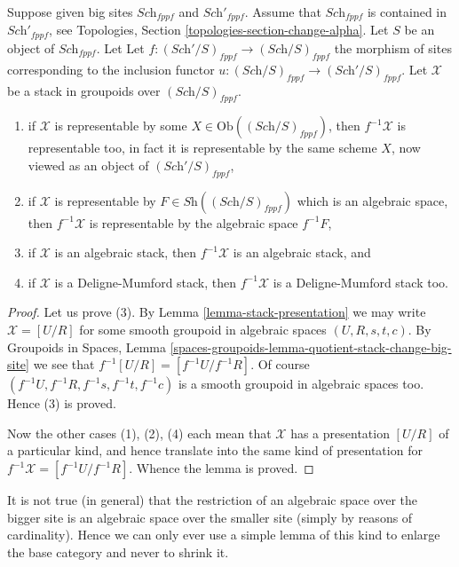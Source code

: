\begin{lemma}
\label{lemma-change-big-site}
Suppose given big sites $\textit{Sch}_{fppf}$ and $\textit{Sch}'_{fppf}$.
Assume that $\textit{Sch}_{fppf}$ is contained in $\textit{Sch}'_{fppf}$,
see Topologies, Section \ref{topologies-section-change-alpha}.
Let $S$ be an object of $\textit{Sch}_{fppf}$. Let
Let $f : (\textit{Sch}'/S)_{fppf} \to (\textit{Sch}/S)_{fppf}$ the morphism
of sites corresponding to the inclusion functor
$u : (\textit{Sch}/S)_{fppf} \to (\textit{Sch}'/S)_{fppf}$.
Let $\mathcal{X}$ be a stack in groupoids over $(\textit{Sch}/S)_{fppf}$.
\begin{enumerate}
\item if $\mathcal{X}$ is representable by some
$X \in \text{Ob}((\textit{Sch}/S)_{fppf})$, then
$f^{-1}\mathcal{X}$ is representable too, in fact it is representable by the
same scheme $X$, now viewed as an object of $(\textit{Sch}'/S)_{fppf}$,
\item if $\mathcal{X}$ is representable by
$F \in \textit{Sh}((\textit{Sch}/S)_{fppf})$ which is
an algebraic space, then $f^{-1}\mathcal{X}$ is representable
by the algebraic space $f^{-1}F$,
\item if $\mathcal{X}$ is an algebraic stack, then $f^{-1}\mathcal{X}$
is an algebraic stack, and
\item if $\mathcal{X}$ is a Deligne-Mumford stack, then $f^{-1}\mathcal{X}$
is a Deligne-Mumford stack too.
\end{enumerate}
\end{lemma}

\begin{proof}
Let us prove (3). By
Lemma \ref{lemma-stack-presentation}
we may write $\mathcal{X} = [U/R]$ for some smooth
groupoid in algebraic spaces $(U, R, s, t, c)$. By
Groupoids in Spaces,
Lemma \ref{spaces-groupoids-lemma-quotient-stack-change-big-site}
we see that $f^{-1}[U/R] = [f^{-1}U/f^{-1}R]$.
Of course $(f^{-1}U, f^{-1}R, f^{-1}s, f^{-1}t, f^{-1}c)$
is a smooth groupoid in algebraic spaces too. Hence (3) is proved.

\medskip\noindent
Now the other cases (1), (2), (4) each mean that $\mathcal{X}$ has
a presentation $[U/R]$ of a particular kind, and hence translate into the
same kind of presentation for $f^{-1}\mathcal{X} = [f^{-1}U/f^{-1}R]$.
Whence the lemma is proved.
\end{proof}

\noindent
It is not true (in general) that the restriction of an algebraic space
over the bigger site is an algebraic space over the smaller site (simply
by reasons of cardinality). Hence we can only ever use a simple lemma of this
kind to enlarge the base category and never to shrink it.

